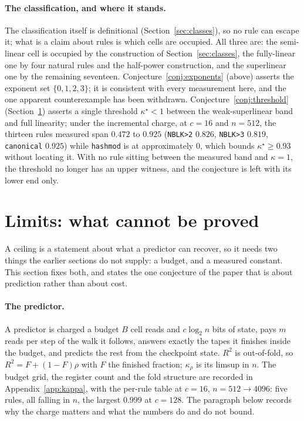 \documentclass[11pt]{article}
\theoremstyle{remark}
\begin{document}
\paragraph{The classification, and where it stands.} The classification itself is definitional (Section~\ref{sec:classes}), so no rule can escape it; what
is a claim about rules is which cells are occupied. All three are: the semi-linear cell is occupied by
the construction of Section~\ref{sec:classes}, the fully-linear one by four natural rules and the
half-power construction, and the superlinear one by the remaining seventeen. Conjecture~\ref{conj:exponents} (above) asserts the
exponent set $\{0,1,2,3\}$; it is consistent with every measurement here, and the one apparent
counterexample has been withdrawn. Conjecture~\ref{conj:threshold} (Section~\ref{sec:kappa}) asserts
a single threshold $\kappa^{\star}<1$ between the weak-superlinear band and full linearity; under
the incremental charge, at $c=16$ and $n=512$, the thirteen rules measured span $0.472$ to $0.925$
(\texttt{NBLK>2} $0.826$, \texttt{NBLK>3} $0.819$, \texttt{canonical} $0.925$) while \texttt{hashmod}
is at approximately $0$, which bounds $\kappa^{\star}\ge0.93$ without locating it. With
no rule sitting between the measured band and $\kappa=1$, the threshold no longer has an upper
witness, and the conjecture is left with its lower end only.

\section{Limits: what cannot be proved}\label{sec:kappa}

A ceiling is a statement about what a predictor can recover, so it needs two things the earlier
sections do not supply: a budget, and a measured constant. This section fixes both, and states the
one conjecture of the paper that is about prediction rather than about cost.

\paragraph{The predictor.} A predictor is charged a budget $B$ cell reads and $c\log_2 n$ bits of
state, pays $m$ reads per step of the walk it follows, answers exactly the tapes it finishes inside
the budget, and predicts the rest from the checkpoint state. $R^{2}$ is out-of-fold, so
$R^{2}=F+(1-F)\rho$ with $F$ the finished fraction; $\kappa_{\rho}$ is its limsup in $n$. The budget
grid, the register count and the fold structure are recorded in Appendix~\ref{app:kappa}, with the
per-rule table at $c=16$, $n=512\to4096$: five rules, all falling in $n$, the largest $0.999$ at
$c=128$. The paragraph below records why the charge matters and what the numbers do and do not bound.
\end{document}
